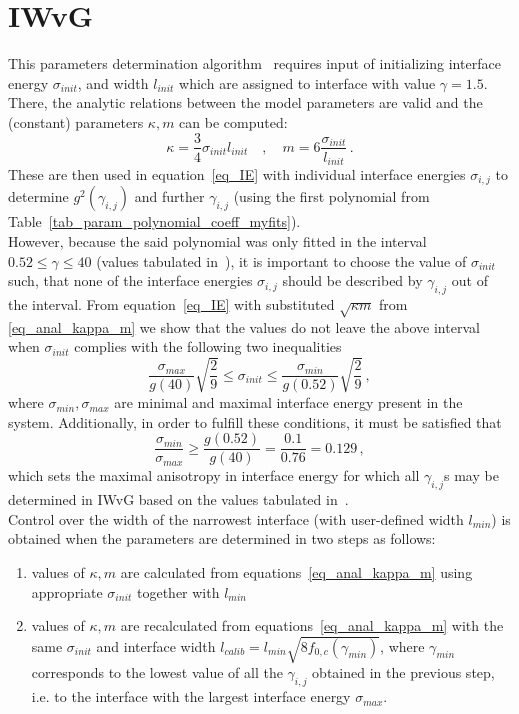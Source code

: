 \section{IWvG}
This parameters determination algorithm~\cite{Ravash2017} requires input of initializing interface energy $\sigma_{init}$, and width $l_{init}$ which are assigned to interface with value $\gamma=1.5$. There, the analytic relations between the model parameters are valid and the (constant) parameters $\kappa,m$ can be computed:
\begin{equation}\label{eq_anal_kappa_m}
	\kappa = \frac{3}{4}\sigma_{init}l_{init} \quad ,\quad m = 6\frac{\sigma_{init}}{l_{init}} \,.
\end{equation}
These are then used in equation~\eqref{eq_IE} with individual interface energies $\sigma_{i,j}$ to determine $g^2(\gamma_{i,j})$ and further $\gamma_{i,j}$ (using the first polynomial from Table~\ref{tab_param_polynomial_coeff_myfits}).\\
However, because the said polynomial was only fitted in the interval $0.52\leq\gamma\leq 40$ (values tabulated in~\cite{Ravash2017}), it is important to choose the value of $\sigma_{init}$ such, that none of the interface energies $\sigma_{i,j}$ should be described by $\gamma_{i,j}$ out of the interval. From equation~\eqref{eq_IE} with substituted $\sqrt{\kappa m}$ from \ref{eq_anal_kappa_m} we show that the values do not leave the above interval when $\sigma_{init}$ complies with the following two inequalities
\begin{equation}
	\frac{\sigma_{max}}{g(40)}\sqrt{\frac{2}{9}}\leq \sigma_{init}\leq \frac{\sigma_{min}}{g(0.52)}\sqrt{\frac{2}{9}} \,,
\end{equation}
where $\sigma_{min},\sigma_{max}$ are minimal and maximal interface energy present in the system. Additionally, in order to fulfill these conditions, it must be satisfied that
\begin{equation}
	\frac{\sigma_{min}}{\sigma_{max}} \geq \frac{g(0.52)}{g(40)} = \frac{0.1}{0.76} = 0.129 \,,
\end{equation}
which sets the maximal anisotropy in interface energy for which all $\gamma_{i,j}$s may be determined in IWvG based on the values tabulated in~\cite{Ravash2017}.\\
Control over the width of the narrowest interface (with user-defined width $l_{min}$) is obtained when the parameters are determined in two steps as follows:
\begin{enumerate}
	\item values of $\kappa,m$ are calculated from equations~\eqref{eq_anal_kappa_m} using appropriate $\sigma_{init}$ together with $l_{min}$
	\item values of $\kappa,m$ are recalculated from equations~\eqref{eq_anal_kappa_m} with the same $\sigma_{init}$ and interface width $l_{calib}=l_{min}\sqrt{8f_{0,c}(\gamma_{min})}$,  where $\gamma_{min}$ corresponds to the lowest value of all the $\gamma_{i,j}$ obtained in the previous step, i.e. to the interface with the largest interface energy $\sigma_{max}$. 
\end{enumerate}
